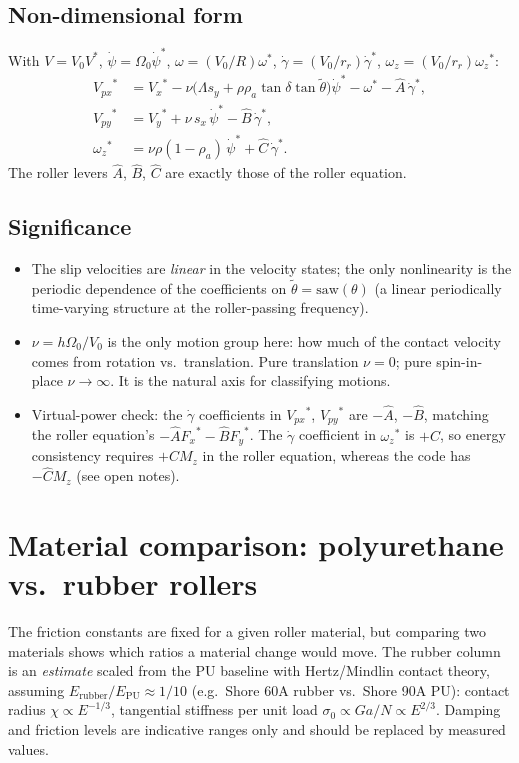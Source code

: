 \documentclass[11pt]{article}
\newcommand{\st}[1]{{#1}^{*}}
\begin{document}
\subsection{Non-dimensional form}
With $V = V_0\st V$, $\dot\psi = \Omega_0\st{\dot\psi}$,
$\omega = (V_0/R)\st\omega$, $\dot\gamma = (V_0/r_r)\st{\dot\gamma}$,
$\omega_z = (V_0/r_r)\st{\omega_z}$:
\begin{align}
\st{V_{px}} &= \st{V_x} - \nu\big(\Lambda s_y + \rho\rho_a\tan\delta\tan\tilde\theta\big)\st{\dot\psi}
  - \st{\omega} - \hat A\,\st{\dot\gamma},\\
\st{V_{py}} &= \st{V_y} + \nu\,s_x\,\st{\dot\psi} - \hat B\,\st{\dot\gamma},\\
\st{\omega_z} &= \nu\rho(1-\rho_a)\,\st{\dot\psi} + \hat C\,\st{\dot\gamma}.
\end{align}
The roller levers $\hat A$, $\hat B$, $\hat C$ are exactly those of the roller
equation.

\subsection{Significance}
\begin{itemize}
  \item The slip velocities are \emph{linear} in the velocity states; the only
    nonlinearity is the periodic dependence of the coefficients on
    $\tilde\theta = \mathrm{saw}(\theta)$ (a linear periodically time-varying
    structure at the roller-passing frequency).
  \item $\nu = h\Omega_0/V_0$ is the only motion group here: how much of the
    contact velocity comes from rotation vs.\ translation. Pure translation
    $\nu = 0$; pure spin-in-place $\nu \to \infty$. It is the natural axis for
    classifying motions.
  \item Virtual-power check: the $\dot\gamma$ coefficients in $\st{V_{px}}$,
    $\st{V_{py}}$ are $-\hat A$, $-\hat B$, matching the roller equation's
    $-\hat A\st{F_x} - \hat B\st{F_y}$. The $\dot\gamma$ coefficient in
    $\st{\omega_z}$ is $+\hat C$, so energy consistency requires $+\hat C M_z$ in
    the roller equation, whereas the code has $-\hat C M_z$ (see open notes).
\end{itemize}

\section{Material comparison: polyurethane vs.\ rubber rollers}
The friction constants are fixed for a given roller material, but comparing two
materials shows which ratios a material change would move. The rubber column is
an \emph{estimate} scaled from the PU baseline with Hertz/Mindlin contact
theory, assuming $E_{\mathrm{rubber}}/E_{\mathrm{PU}} \approx 1/10$ (e.g.\ Shore 60A
rubber vs.\ Shore 90A PU): contact radius $\chi \propto E^{-1/3}$, tangential
stiffness per unit load $\sigma_0 \propto G a/N \propto E^{2/3}$. Damping and
friction levels are indicative ranges only and should be replaced by measured
values.
\end{document}

